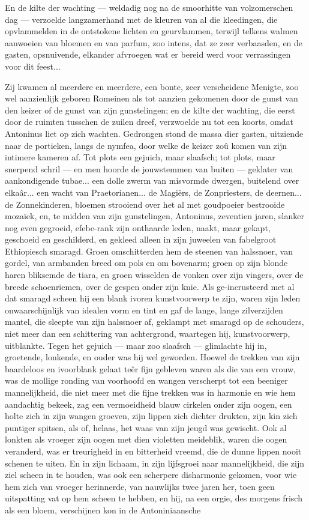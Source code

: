 \documentclass[a4paper, 12pt, oneside, dutch]{article}
\begin{document}
En de kilte der wachting --- weldadig nog na de smoorhitte van volzomerschen dag --- verzoelde langzamerhand met de kleuren van al die kleedingen, die opvlammelden in de ontstokene lichten en geurvlammen, terwijl telkens walmen aanwoeien van bloemen en van parfum, zoo intens, dat ze zeer verbaasden, en de gasten, opsnuivende, elkander afvroegen wat er bereid werd voor verrassingen voor dit feest...

Zij kwamen al meerdere en meerdere, een bonte, zeer verscheidene Menigte, zoo wel aanzienlijk geboren Romeinen als tot aanzien gekomenen door de gunst van den keizer of de gunst van zijn gunstelingen; en de kilte der wachting, die eerst door de ruimten tusschen de zuilen dreef, verzwoelde nu tot een koorts, omdat Antoninus liet op zich wachten. Gedrongen stond de massa dier gasten, uitziende naar de portieken, langs de nymfea, door welke de keizer zoû komen van zijn intimere kameren af. Tot plots een gejuich, maar slaafsch; tot plots, maar snerpend schril --- en men hoorde de jouwstemmen van buiten --- geklater van aankondigende tubae... een dolle zwerm van misvormde dwergen, buitelend over elkaâr... een wacht van Praetorianen... de Magiërs, de Zonpriesters, de deernen... de Zonnekinderen, bloemen strooiend over het al met goudpoeier bestrooide mozaïek, en, te midden van zijn gunstelingen, Antoninus, zeventien jaren, slanker nog even gegroeid, efebe-rank zijn onthaarde leden, naakt, maar gekapt, geschoeid en geschilderd, en gekleed alleen in zijn juweelen van fabelgroot Ethiopiesch smaragd. Groen omschitterden hem de steenen van halssnoer, van gordel, van armbanden breed om pols en om bovenarm; groen op zijn blonde haren bliksemde de tiara, en groen wisselden de vonken over zijn vingers, over de breede schoenriemen, over de gespen onder zijn knie. Als ge-incrusteerd met al dat smaragd scheen hij een blank ivoren kunstvoorwerp te zijn, waren zijn leden onwaarschijnlijk van idealen vorm en tint en gaf de lange, lange zilverzijden mantel, die sleepte van zijn halssnoer af, geklampt met smaragd op de schouders, niet meer dan een schittering van achtergrond, waartegen hij, kunstvoorwerp, uitblankte. Tegen het gejuich --- maar zoo slaafsch --- glimlachte hij in, groetende, lonkende, en ouder was hij wel geworden. Hoewel de trekken van zijn baardeloos en ivoorblank gelaat teêr fijn gebleven waren als die van een vrouw, was de mollige ronding van voorhoofd en wangen verscherpt tot een beeniger mannelijkheid, die niet meer met die fijne trekken was in harmonie en wie hem aandachtig bekeek, zag een vermoeidheid blauw cirkelen onder zijn oogen, een holte zich in zijn wangen groeven, zijn lippen zich dichter drukten, zijn kin zich puntiger spitsen, als of, helaas, het waas van zijn jeugd was gewischt. Ook al lonkten als vroeger zijn oogen met dien violetten meideblik, waren die oogen veranderd, was er treurigheid in en bitterheid vreemd, die de dunne lippen nooit schenen te uiten. En in zijn lichaam, in zijn lijfsgroei naar mannelijkheid, die zijn ziel scheen in te houden, was ook een scherpere disharmonie gekomen, voor wie hem zich van vroeger herinnerde, van nauwlijks twee jaren her, toen geen uitspatting vat op hem scheen te hebben, en hij, na een orgie, des morgens frisch als een bloem, verschijnen kon in de Antoniniaansche 
\end{document}
